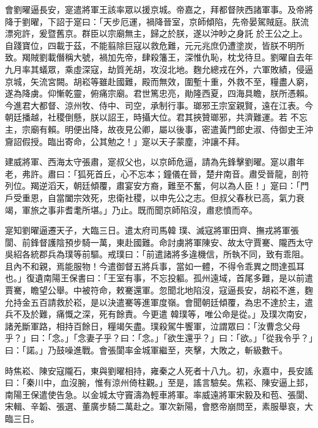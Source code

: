 \begin{pinyinscope}
 會劉曜逼長安，寔遣將軍王該率眾以援京城。帝嘉之，拜都督陜西諸軍事。及帝將降于劉曜，下詔于寔曰：「天步厄運，禍降晉室，京師傾陷，先帝晏駕賊庭。朕流漂宛許，爰暨舊京。群臣以宗廟無主，歸之於朕，遂以沖眇之身託
 於王公之上。自踐寶位，四載于茲，不能翦除巨寇以救危難，元元兆庶仍遭塗炭，皆朕不明所致。羯賊劉載僭稱大號，禍加先帝，肆殺籓王，深惟仇恥，枕戈待旦。劉曜自去年九月率其蟻眾，乘虛深寇，劫質羌胡，攻沒北地。麴允總戎在外，六軍敗績，侵逼京城，矢流宮闕。胡崧等雖赴國難，殿而無效，圍塹十重，外救不至，糧盡人窮，遂為降虜。仰慚乾靈，俯痛宗廟。君世篤忠亮，勛隆西夏，四海具瞻，朕所憑賴。今進君大都督、涼州牧、侍中、司空，承制行事。瑯邪王宗室親賢，遠在江表。今朝廷播越，社稷倒懸，朕以詔王，時攝大位。君其挾贊瑯邪，共濟難運。若
 不忘主，宗廟有賴。明便出降，故夜見公卿，屬以後事，密遣黃門郎史淑、侍御史王沖齎詔假授。臨出寄命，公其勉之！」寔以天子蒙塵，沖讓不拜。



 建威將軍、西海太守張肅，寔叔父也，以京師危逼，請為先鋒擊劉曜。寔以肅年老，弗許。肅曰：「狐死首丘，心不忘本；鐘儀在晉，楚弁南音。肅受晉龍，剖符列位。羯逆滔天，朝廷傾覆，肅宴安方裔，難至不奮，何以為人臣！」寔曰：「門戶受重恩，自當闔宗效死，忠衛社稷，以申先公之志。但叔父春秋已高，氣力衰竭，軍旅之事非耆耄所堪。」乃止。既而聞京師陷沒，肅悲憤而卒。



 寔知劉曜逼遷天子，大臨三日。遣太府司馬韓
 璞、滅寇將軍田齊、撫戎將軍張閬、前鋒督護陰預步騎一萬，東赴國難。命討虜將軍陳安、故太守賈騫、隴西太守吳紹各統郡兵為璞等前驅。戒璞曰：「前遣諸將多違機信，所執不同，致有乖阻。且內不和親，焉能服物！今遣御督五將兵事，當如一體，不得令乖異之問達孤耳也。」復遺南陽王保書曰：「王室有事，不忘投軀。孤州遠域，首尾多難，是以前遣賈騫，瞻望公舉。中被符命，敕騫還軍。忽聞北地陷沒，寇逼長安，胡崧不進，麴允持金五百請救於崧，是以決遣騫等進軍度嶺。會聞朝廷傾覆，為忠不達於主，遣兵不及於難，痛慨之深，死有餘責。今更遣
 韓璞等，唯公命是從。」及璞次南安，諸羌斷軍路，相持百餘日，糧竭矢盡。璞殺駕牛饗軍，泣謂眾曰：「汝曹念父母乎？」曰：「念。」「念妻子乎？曰：「念。」「欲生還乎？」曰：「欲。」「從我令乎？」曰：「諾。」乃鼓噪進戰。會張閬率金城軍繼至，夾擊，大敗之，斬級數千。



 時焦崧、陳安寇隴石，東與劉曜相持，雍秦之人死者十八九。初，永嘉中，長安謠曰：「秦川中，血沒腕，惟有涼州倚柱觀。」至是，謠言驗矣。焦崧、陳安逼上邽，南陽王保遣使告急。以金城太守竇濤為輕車將軍。率威遠將軍宋毅及和苞、張閬、宋輯、辛韜、張選、董廣步騎二萬赴之。軍次新陽，會愍帝崩問至，素服舉哀，大臨三日。




\end{pinyinscope}
